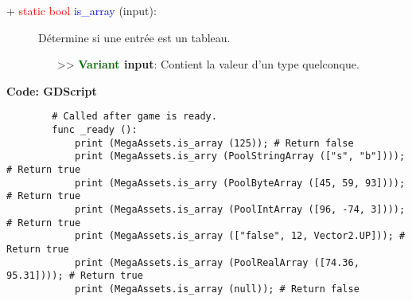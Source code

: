 \documentclass[a4paper, 11pt]{article}
\begin{document}
	\begin{description}
		\item [+ \textcolor{red}{static bool} \textcolor{blue}{is\_array} (input):] Détermine si une entrée 
		est un tableau.
		\begin{itemize}
			\item [>> \textbf{\textcolor{darkgreen}{Variant} input}:] Contient la valeur d'un type 
			quelconque.\\
		\end{itemize}
	\end{description}
	\textbf{Code: GDScript}
	\begin{lstlisting}
		# Called after game is ready.
		func _ready ():
			print (MegaAssets.is_array (125)); # Return false
			print (MegaAssets.is_arry (PoolStringArray (["s", "b"]))); # Return true
			print (MegaAssets.is_arry (PoolByteArray ([45, 59, 93]))); # Return true
			print (MegaAssets.is_array (PoolIntArray ([96, -74, 3]))); # Return true
			print (MegaAssets.is_array (["false", 12, Vector2.UP])); # Return true
			print (MegaAssets.is_array (PoolRealArray ([74.36, 95.31]))); # Return true
			print (MegaAssets.is_array (null)); # Return false
	\end{lstlisting}
\end{document}
